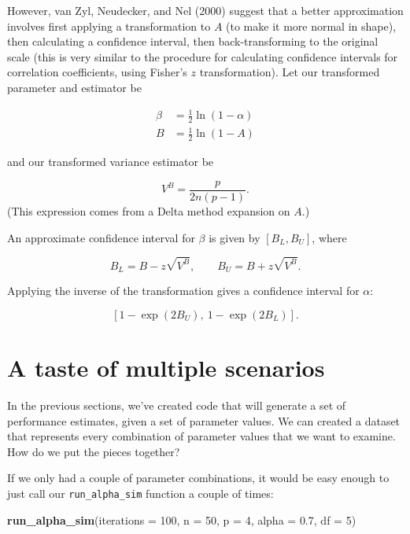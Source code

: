 \documentclass[
]{book}
\newenvironment{Shaded}{\begin{snugshade}}{\end{snugshade}}
\newcommand{\AttributeTok}[1]{\textcolor[rgb]{0.13,0.29,0.53}{#1}}
\newcommand{\DecValTok}[1]{\textcolor[rgb]{0.00,0.00,0.81}{#1}}
\newcommand{\FloatTok}[1]{\textcolor[rgb]{0.00,0.00,0.81}{#1}}
\newcommand{\FunctionTok}[1]{\textcolor[rgb]{0.13,0.29,0.53}{\textbf{#1}}}
\newcommand{\NormalTok}[1]{#1}
\begin{document}
However, van Zyl, Neudecker, and Nel (2000) suggest that a better approximation involves first applying a transformation to \(A\) (to make it more normal in shape), then calculating a confidence interval, then back-transforming to the original scale (this is very similar to the procedure for calculating confidence intervals for correlation coefficients, using Fisher's \(z\) transformation). Let our transformed parameter and estimator be

\[
\begin{aligned}
\beta &= \frac{1}{2} \ln\left(1 - \alpha\right) \\
B &= \frac{1}{2} \ln\left(1 - A\right)
\end{aligned}
\]

and our transformed variance estimator be

\[
V^B = \frac{p}{2 n (p - 1)}.
\]
(This expression comes from a Delta method expansion on \(A\).)

An approximate confidence interval for \(\beta\) is given by \([B_L, B_U]\), where

\[
B_L = B - z \sqrt{V^B}, \qquad B_U = B + z \sqrt{V^B}.
\]

Applying the inverse of the transformation gives a confidence interval for \(\alpha\):

\[
\left[1 - \exp(2B_U), \ 1 - \exp(2 B_L)\right].
\]

\section{A taste of multiple scenarios}\label{a-taste-of-multiple-scenarios}

In the previous sections, we've created code that will generate a set of performance estimates, given a set of parameter values. We can created a dataset that represents every combination of parameter values that we want to examine. How do we put the pieces together?

If we only had a couple of parameter combinations, it would be easy enough to just call our \texttt{run\_alpha\_sim} function a couple of times:

\begin{Shaded}
\begin{Highlighting}[]
\FunctionTok{run\_alpha\_sim}\NormalTok{(}\AttributeTok{iterations =} \DecValTok{100}\NormalTok{, }\AttributeTok{n =} \DecValTok{50}\NormalTok{, }\AttributeTok{p =} \DecValTok{4}\NormalTok{, }\AttributeTok{alpha =} \FloatTok{0.7}\NormalTok{, }\AttributeTok{df =} \DecValTok{5}\NormalTok{)}
\end{Highlighting}
\end{Shaded}
\end{document}
